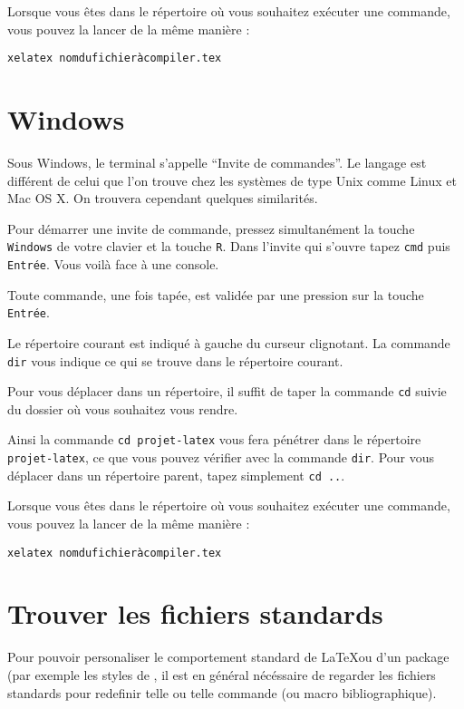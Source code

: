 Lorsque vous êtes dans le répertoire où vous souhaitez exécuter une
commande, vous pouvez la lancer de la même manière :

\begin{verbatim}
xelatex nomdufichieràcompiler.tex
\end{verbatim}

\section{Windows}
Sous Windows, le terminal s'appelle \enquote{Invite de commandes}. Le langage
est différent de celui que l'on trouve chez les systèmes de type Unix comme
Linux et Mac OS X. On trouvera cependant quelques similarités.

Pour démarrer une invite de commande, pressez simultanément la touche \verb|Windows| de votre
clavier et la touche \verb|R|. Dans l'invite qui s'ouvre tapez \verb|cmd| puis
\verb|Entrée|. Vous voilà face à une console.

Toute commande, une fois tapée, est validée par une pression sur la touche \verb|Entrée|.

Le répertoire courant est indiqué à gauche du curseur clignotant.
La commande \verb|dir| vous indique ce qui se trouve dans le répertoire
courant.

Pour vous déplacer dans un répertoire, il suffit de taper la commande
\verb|cd| suivie du dossier où vous souhaitez vous rendre.

Ainsi la commande \verb|cd projet-latex| vous fera pénétrer dans le
répertoire \verb|projet-latex|, ce que vous pouvez vérifier avec la
commande \verb|dir|. Pour vous déplacer dans un répertoire parent, tapez
simplement \verb|cd ..|.

Lorsque vous êtes dans le répertoire où vous souhaitez exécuter une
commande, vous pouvez la lancer de la même manière :

\begin{verbatim}
xelatex nomdufichieràcompiler.tex
\end{verbatim}

\section{Trouver les fichiers standards}\label{trouverfichier}

Pour pouvoir personaliser le comportement standard de \LaTeX ou d'un package (par exemple les styles de , il est en général nécéssaire de regarder les fichiers standards pour redefinir telle ou telle commande (ou macro bibliographique). 

